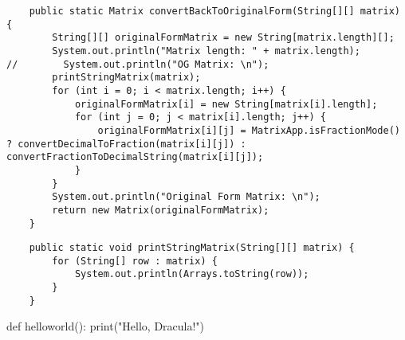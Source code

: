\documentclass{article}
\begin{document}
\begin{verbatim}
    public static Matrix convertBackToOriginalForm(String[][] matrix) {
        String[][] originalFormMatrix = new String[matrix.length][];
        System.out.println("Matrix length: " + matrix.length);
//        System.out.println("OG Matrix: \n");
        printStringMatrix(matrix);
        for (int i = 0; i < matrix.length; i++) {
            originalFormMatrix[i] = new String[matrix[i].length];
            for (int j = 0; j < matrix[i].length; j++) {
                originalFormMatrix[i][j] = MatrixApp.isFractionMode() ? convertDecimalToFraction(matrix[i][j]) : convertFractionToDecimalString(matrix[i][j]);
            }
        }
        System.out.println("Original Form Matrix: \n");
        return new Matrix(originalFormMatrix);
    }
\end{verbatim}


\begin{verbatim}
    public static void printStringMatrix(String[][] matrix) {
        for (String[] row : matrix) {
            System.out.println(Arrays.toString(row));
        }
    }
\end{verbatim}

\begin{dracpython}
    def helloworld():
        print("Hello, Dracula!")
\end{dracpython}
\end{document}
